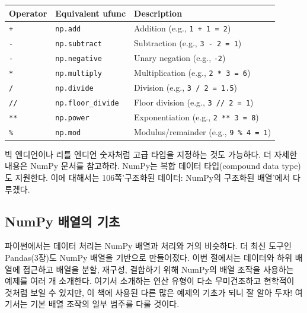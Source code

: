 \documentclass[11pt]{article}
\begin{document}
    \begin{longtable}[]{@{}lll@{}}
\toprule
Operator & Equivalent ufunc & Description\tabularnewline
\midrule
\endhead
\texttt{+} & \texttt{np.add} & Addition (e.g.,
\texttt{1\ +\ 1\ =\ 2})\tabularnewline
\texttt{-} & \texttt{np.subtract} & Subtraction (e.g.,
\texttt{3\ -\ 2\ =\ 1})\tabularnewline
\texttt{-} & \texttt{np.negative} & Unary negation (e.g.,
\texttt{-2})\tabularnewline
\texttt{*} & \texttt{np.multiply} & Multiplication (e.g.,
\texttt{2\ *\ 3\ =\ 6})\tabularnewline
\texttt{/} & \texttt{np.divide} & Division (e.g.,
\texttt{3\ /\ 2\ =\ 1.5})\tabularnewline
\texttt{//} & \texttt{np.floor\_divide} & Floor division (e.g.,
\texttt{3\ //\ 2\ =\ 1})\tabularnewline
\texttt{**} & \texttt{np.power} & Exponentiation (e.g.,
\texttt{2\ **\ 3\ =\ 8})\tabularnewline
\texttt{\%} & \texttt{np.mod} & Modulus/remainder (e.g.,
\texttt{9\ \%\ 4\ =\ 1})\tabularnewline
\bottomrule
\end{longtable}

    빅 엔디언이나 리틀 엔디언 숫자처럼 고급 타입을 지정하는 것도 가능하다.
더 자세한 내용은 NumPy 문서를 참고하라. NumPy는 복합 데이터
타입(compound data type)도 지원한다. 이에 대해서는 106쪽'구조화된
데이터: NumPy의 구조화된 배열'에서 다루겠다.

    \hypertarget{numpy-uxbc30uxc5f4uxc758-uxae30uxcd08}{%
\subsection{NumPy 배열의
기초}\label{numpy-uxbc30uxc5f4uxc758-uxae30uxcd08}}

파이썬에서는 데이터 처리는 NumPy 배열과 처리와 거의 비슷하다. 더 최신
도구인 Pandas(3장)도 NumPy 배열을 기반으로 만들어졌다. 이번 절에서는
데이터와 하위 배열에 접근하고 배열을 분할, 재구성, 결합하기 위해 NumPy의
배열 조작을 사용하는 예제를 여러 개 소개한다. 여기서 소개하는 연산
유형이 다소 무미건조하고 현학적이 것처럼 보일 수 있지만, 이 책에 사용된
다른 많은 예제의 기초가 되니 잘 알아 두자! 여기서는 기본 배열 조작의
일부 범주를 다룰 것이다.
\end{document}
